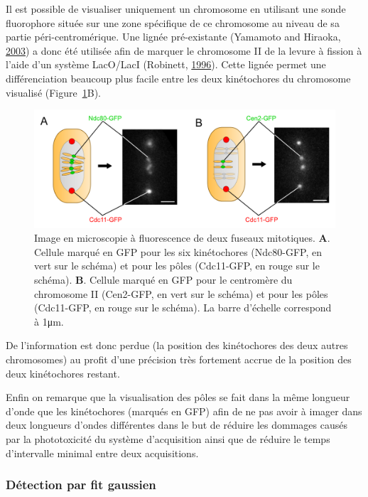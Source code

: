 \documentclass[12pt,a4paper,twoside,openright]{book}
\begin{document}
Il est possible de visualiser uniquement un chromosome en utilisant une
sonde fluorophore située sur une zone spécifique de ce chromosome au
niveau de sa partie péri-centromérique. Une lignée pré-existante
(Yamamoto and Hiraoka, \hyperref[ref-Yamamoto2003]{2003}) a donc été
utilisée afin de marquer le chromosome II de la levure à fission à
l'aide d'un système LacO/LacI (Robinett,
\hyperref[ref-Robinett1996]{1996}). Cette lignée permet une
différenciation beaucoup plus facile entre les deux kinétochores du
chromosome visualisé (Figure~\ref{fig:spindle_peaks}B).

\begin{figure}[htbp]
\centering
\includegraphics{figures/results/imaging/spindle_peaks.png}
\caption[Image en microscopie à fluorescence de deux fuseaux mitotique]{\label{fig:spindle_peaks}Image
en microscopie à fluorescence de deux fuseaux mitotiques. \textbf{A}.
Cellule marqué en GFP pour les six kinétochores (Ndc80-GFP, en vert sur
le schéma) et pour les pôles (Cdc11-GFP, en rouge sur le schéma).
\textbf{B}. Cellule marqué en GFP pour le centromère du chromosome II
(Cen2-GFP, en vert sur le schéma) et pour les pôles (Cdc11-GFP, en rouge
sur le schéma). La barre d'échelle correspond à 1μm.}
\end{figure}

De l'information est donc perdue (la position des kinétochores des deux
autres chromosomes) au profit d'une précision très fortement accrue de
la position des deux kinétochores restant.

Enfin on remarque que la visualisation des pôles se fait dans la même
longueur d'onde que les kinétochores (marqués en GFP) afin de ne pas
avoir à imager dans deux longueurs d'ondes différentes dans le but de
réduire les dommages causés par la phototoxicité du système
d'acquisition ainsi que de réduire le temps d'intervalle minimal entre
deux acquisitions.

\subsubsection{Détection par fit
gaussien}\label{duxe9tection-par-fit-gaussien}
\end{document}

